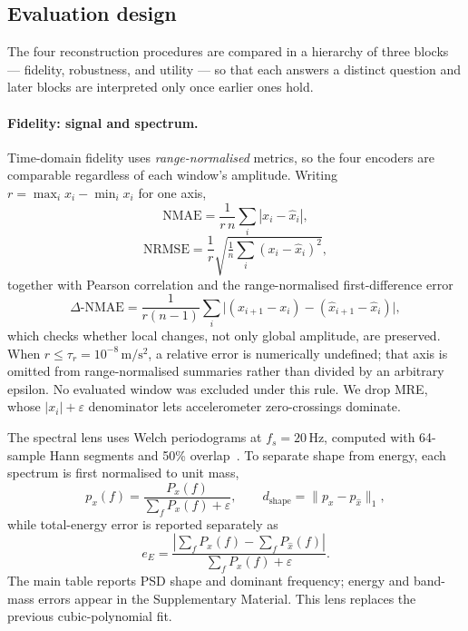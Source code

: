\documentclass[5p]{elsarticle}
\begin{document}
\subsection{Evaluation design}

The four reconstruction procedures are compared in a hierarchy of three blocks --- fidelity, robustness, and utility --- so that each answers a distinct question and later blocks are interpreted only once earlier ones hold.

\paragraph{Fidelity: signal and spectrum.}\label{sec:fidelity_metrics}
Time-domain fidelity uses \emph{range-normalised} metrics, so the four encoders are comparable regardless of each window's amplitude. Writing \(r=\max_i x_i-\min_i x_i\) for one axis,
\[
\mathrm{NMAE}=\frac{1}{r\,n}\sum_i|x_i-\hat x_i|,
\]
\[
\mathrm{NRMSE}=\frac{1}{r}\sqrt{\tfrac1n\sum_i{(x_i-\hat x_i)}^2},
\]
together with Pearson correlation and the range-normalised first-difference error
\[
\Delta\text{-NMAE}=\frac{1}{r(n-1)}\sum_i\bigl|(x_{i+1}-x_i)-(\hat x_{i+1}-\hat x_i)\bigr|,
\]
which checks whether local changes, not only global amplitude, are preserved. When \(r\le\tau_r=10^{-8}\,\mathrm{m/s^2}\), a relative error is numerically undefined; that axis is omitted from range-normalised summaries rather than divided by an arbitrary epsilon. No evaluated window was excluded under this rule. We drop MRE, whose \(|x_i|+\varepsilon\) denominator lets accelerometer zero-crossings dominate.

The spectral lens uses Welch periodograms at \(f_s=20\,\)Hz, computed with 64-sample Hann segments and 50\% overlap~\cite{Welch1967}. To separate shape from energy, each spectrum is first normalised to unit mass,
\[
p_x(f)=\frac{P_x(f)}{\sum_f P_x(f)+\varepsilon},\qquad
d_{\mathrm{shape}}=\lVert p_x-p_{\hat x}\rVert_1,
\]
while total-energy error is reported separately as
\[
e_E=\frac{|\sum_f P_x(f)-\sum_f P_{\hat x}(f)|}{\sum_f P_x(f)+\varepsilon}.
\]
The main table reports PSD shape and dominant frequency; energy and band-mass errors appear in the Supplementary Material. This lens replaces the previous cubic-polynomial fit.
\end{document}
